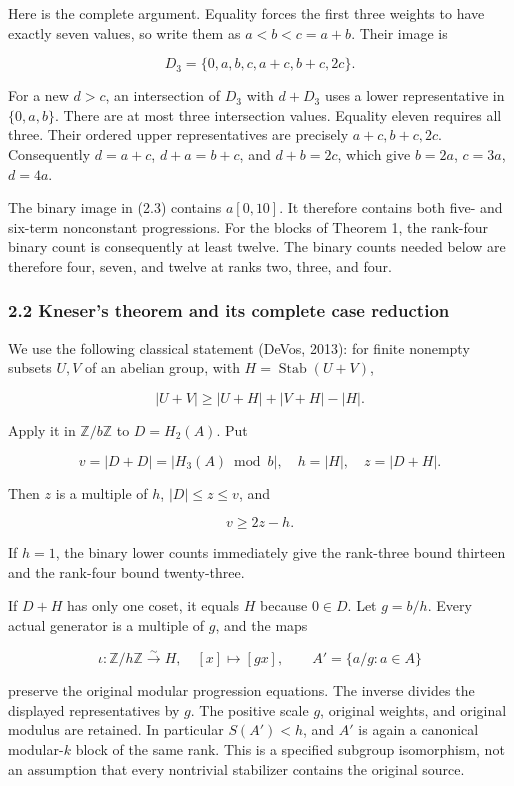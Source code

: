 Here is the complete argument. Equality forces the first three weights to have exactly seven values, so write them as \(a<b<c=a+b\). Their image is

\[
D_3=\{0,a,b,c,a+c,b+c,2c\}.
\]

For a new \(d>c\), an intersection of \(D_3\) with \(d+D_3\) uses a lower representative in \(\{0,a,b\}\). There are at most three intersection values. Equality eleven requires all three. Their ordered upper representatives are precisely \(a+c,b+c,2c\). Consequently \(d=a+c\), \(d+a=b+c\), and \(d+b=2c\), which give \(b=2a\), \(c=3a\), \(d=4a\).

The binary image in (2.3) contains \(a[0,10]\). It therefore contains both five- and six-term nonconstant progressions. For the blocks of Theorem 1, the rank-four binary count is consequently at least twelve. The binary counts needed below are therefore four, seven, and twelve at ranks two, three, and four.

\subsubsection{2.2 Kneser's theorem and its complete case reduction}\label{knesers-theorem-and-its-complete-case-reduction}

We use the following classical statement (DeVos, 2013): for finite nonempty subsets \(U,V\) of an abelian group, with \(H=\operatorname{Stab}(U+V)\),

\[
|U+V|\ge|U+H|+|V+H|-|H|.
\tag{2.4}
\]

Apply it in \(\mathbb Z/b\mathbb Z\) to \(D=H_2(A)\). Put

\[
v=|D+D|=|H_3(A)\bmod b|,\quad h=|H|,\quad z=|D+H|.
\]

Then \(z\) is a multiple of \(h\), \(|D|\le z\le v\), and

\[
v\ge2z-h.
\tag{2.5}
\]

If \(h=1\), the binary lower counts immediately give the rank-three bound thirteen and the rank-four bound twenty-three.

If \(D+H\) has only one coset, it equals \(H\) because \(0\in D\). Let \(g=b/h\). Every actual generator is a multiple of \(g\), and the maps

\[
\iota:\mathbb Z/h\mathbb Z\overset\sim\longrightarrow H,
\quad[x]\longmapsto[gx],\qquad
A'=\{a/g:a\in A\}
\tag{2.6}
\]

preserve the original modular progression equations. The inverse divides the displayed representatives by \(g\). The positive scale \(g\), original weights, and original modulus are retained. In particular \(S(A')<h\), and \(A'\) is again a canonical modular-\(k\) block of the same rank. This is a specified subgroup isomorphism, not an assumption that every nontrivial stabilizer contains the original source.

